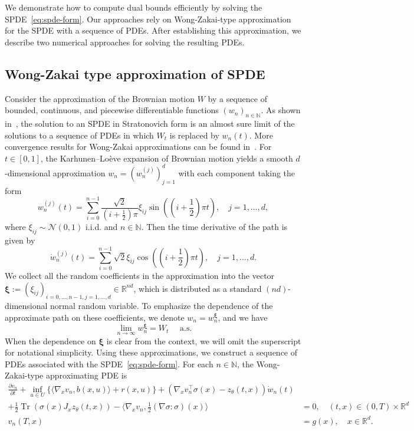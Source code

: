 \documentclass[11pt]{article}
\numberwithin{equation}{section}
\theoremstyle{plain}
\theoremstyle{definition}
\theoremstyle{remark}
\newcommand{\op}{\operatorname}
\newcommand{\R}{\mathbb{R}}
\begin{document}
We demonstrate how to compute dual bounds efficiently by solving the SPDE~\eqref{eq:spde-form}. Our approaches rely on Wong-Zakai-type approximation for the SPDE with a sequence of PDEs. After establishing this approximation, we describe two numerical approaches for solving the resulting PDEs. 

\subsection{Wong-Zakai type approximation of SPDE}
Consider the approximation of the Brownian motion $W$ by a sequence of bounded, continuous, and piecewise differentiable functions $(w_n)_{n\in \mathbb{N}}$. 
As shown in~\cite{brzezniak1995almost}, the solution to an SPDE in Stratonovich form is an almost sure limit of the solutions to a sequence of PDEs in which $W_t$ is replaced by $w_n(t)$. More convergence results for Wong-Zakai approximations can be found in~\cite{twardowska1995approximation, caruana2011rough}. 
For $t\in [0, 1]$, the Karhunen–Lo\`{e}ve expansion of Brownian motion yields a smooth $d$-dimensional approximation $w_n = (w_n^{(j)})_{j=1}^{d}$ with each component taking the form 
\begin{equation*}
    w_n^{(j)}(t) = \sum_{i=0}^{n-1} \frac{\sqrt{2}}{(i+\frac{1}{2})\pi} \xi_{ij} \sin\left( (i+\frac{1}{2})\pi t \right), \quad j=1, \dots, d,
\end{equation*}
where $\xi_{ij} \sim \mathcal{N}(0,1)$ i.i.d. and $n\in \mathbb{N}$. Then the time derivative of the path is given by 
\begin{equation*}
    \dot{w}_n^{(j)}(t) = \sum_{i=0}^{n-1}\sqrt{2}\xi_{ij} \cos\left( (i+\frac{1}{2})\pi t \right), \quad j=1, \dots, d.
\end{equation*}
We collect all the random coefficients in the approximation into the vector $\bm{\xi} := (\xi_{ij})_{i=0,\dots,n-1, j=1,\dots, d} \in \R^{nd}$, which is distributed as a standard $(nd)$-dimensional normal random variable. To emphasize the dependence of the approximate path on these coefficients, we denote $w_n = w_n^{\bm{\xi}}$, and we have 
\begin{equation*}
    \lim_{n\to \infty} w_n^{\bm{\xi}} = W_t \quad \text{ a.s.}
\end{equation*}
When the dependence on $\bm{\xi}$ is clear from the context, we will omit the superscript for notational simplicity. 
Using these approximations, we construct a sequence of PDEs associated with the SPDE~\eqref{eq:spde-form}. 
For each $n\in \mathbb{N}$, the Wong-Zakai-type approximating PDE is 
\begin{equation} \label{eq:wong-zakai-pde}
\begin{aligned}
    \frac{\partial v_n}{\partial t} + \inf_{u\in U}\{\langle \nabla_x v_n, b(x,u)\rangle + r(x, u)\} + \left( \nabla_x v_n^\top \sigma(x) - z_\theta(t,x) \right) \dot{w}_n(t) & \\
    + \frac{1}{2}\op{Tr}(\sigma(x) J_xz_\theta(t,x)) - \langle \nabla_x v_n, \frac{1}{2}(\nabla \sigma:\sigma)(x)\rangle &= 0, \quad (t, x) \in (0, T)\times \R^d \\
    v_n(T, x) &= g(x), \quad x\in \R^d. 
\end{aligned}
\end{equation}
\end{document}

